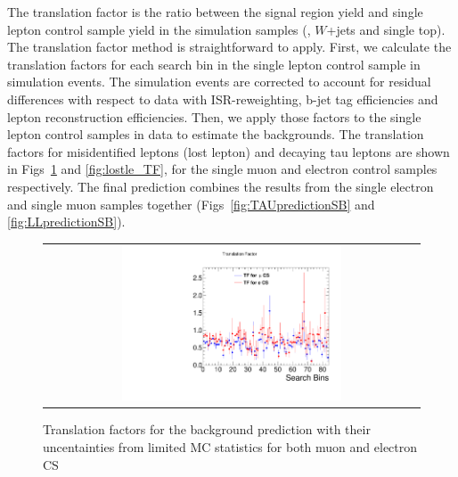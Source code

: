 The translation factor is the ratio between the signal region yield and single lepton control sample yield in the simulation samples (\ttbar, $W$+jets and single top). The translation factor method is straightforward to apply. First, we calculate the translation factors for each search bin in the single lepton control sample in simulation events. The simulation events are corrected to account for residual differences with respect to data with ISR-reweighting, b-jet tag efficiencies and lepton reconstruction efficiencies. Then, we apply those factors to the single lepton control samples in data to estimate the backgrounds. The translation factors for misidentified leptons (lost lepton) and decaying tau leptons are shown in Figs~\ref{fig:hadtau_TF} and \ref{fig:lostle_TF}, for the single muon and electron control samples respectively. The final prediction combines the results from the single electron and single muon samples together (Figs~\ref{fig:TAUpredictionSB} and \ref{fig:LLpredictionSB}). 

\begin{figure}[htbp]
  \begin{center}
  \begin{tabular}{c}
  \includegraphics[angle=0,width=0.60\textwidth]{sections/mc4/Backgrounds/TF/figures/comp_TF_hadtau_comb.pdf}
  \end{tabular}
  \caption{Translation factors for the \tauh background prediction with their uncentainties from limited MC statistics for both muon and electron CS}
    \label{fig:hadtau_TF}
  \end{center}
\end{figure}


